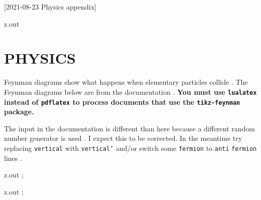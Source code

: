 [2021-08-23 Physics appendix]

\begin{VerbatimOut}{z.out}
\chapter{PHYSICS}

Feynman diagrams
show what happens
when elementary particles collide
\cite{feynman-diagram}.
The Feynman diagrams below are from the
 documentation \cite{ellis2016}.
\textbf{%
  You must use \texttt{lualatex} instead
  of \texttt{pdflatex}
  to process documents that use the \texttt{tikz-feynman} package.%
}

The input
in the documentation
is different than here because a different random number generator
is used \cite{menke2019}.
I expect this to be corrected.
In the meantime try replacing \texttt{vertical}
with \texttt{vertical'}
and/or switch some \texttt{fermion}
to \texttt{anti} \texttt{fermion} lines \cite{ellis2017}.
\end{VerbatimOut}

\MyIO


\begin{VerbatimOut}{z.out}
;
\end{VerbatimOut}

\MyIO


\begin{VerbatimOut}{z.out}
;
\end{VerbatimOut}

\MyIO
